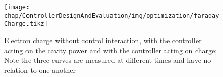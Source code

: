 \begin{figure}[tb]
	\centering
	\texttt{[image: chap/ControllerDesignAndEvaluation/img/optimization/faradayCharge.tikz]}
	\caption{Electron charge without control interaction, with the controller acting on the cavity power and with the controller acting on charge; Note the three curves are measured at different times and have no relation to one another}
	\label{fig:controllerDesignAndEvaluation-optimFaraday}
\end{figure}









